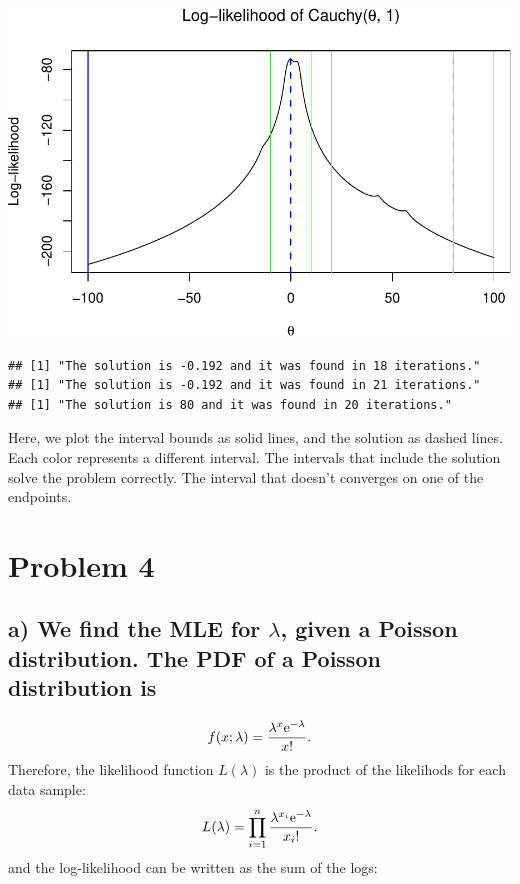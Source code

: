 \documentclass[]{article}
\begin{document}
\includegraphics{Atlas-PS_2_files/figure-latex/plot_bisection_intervals-1.pdf}

\begin{verbatim}
## [1] "The solution is -0.192 and it was found in 18 iterations."
## [1] "The solution is -0.192 and it was found in 21 iterations."
## [1] "The solution is 80 and it was found in 20 iterations."
\end{verbatim}

Here, we plot the interval bounds as solid lines, and the solution as
dashed lines. Each color represents a different interval. The intervals
that include the solution solve the problem correctly. The interval that
doesn't converges on one of the endpoints.

\section{Problem 4}\label{problem-4}

\subsection{\texorpdfstring{a) We find the MLE for \(\lambda\), given a
Poisson distribution. The PDF of a Poisson distribution
is}{a) We find the MLE for \textbackslash{}lambda, given a Poisson distribution. The PDF of a Poisson distribution is}}\label{a-we-find-the-mle-for-lambda-given-a-poisson-distribution.-the-pdf-of-a-poisson-distribution-is}

\[
f(x; \lambda) = \frac{\lambda^{x}\rm{e}^{-\lambda}}{x!}.
\] Therefore, the likelihood function \(L(\lambda)\) is the product of
the likelihods for each data sample: \[
  L(\lambda) = \prod_{i=1}^{n} \frac{\lambda^{x_i}\rm{e}^{-\lambda}}{x_i!}.
\] and the log-likelihood can be written as the sum of the logs:
\end{document}
